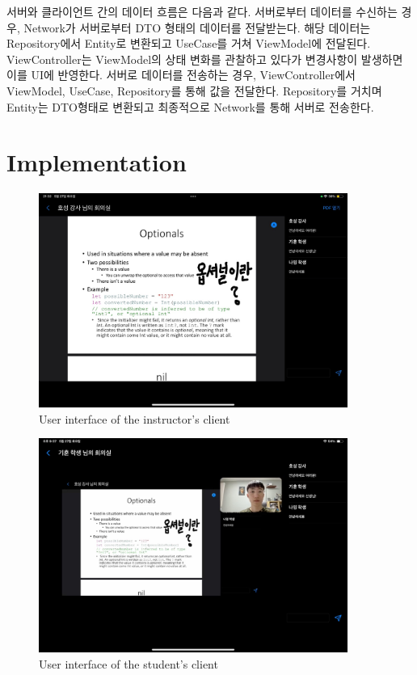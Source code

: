 \documentclass[pdflatex,sn-mathphys-num]{sn-jnl}%
\theoremstyle{thmstyleone}%
\theoremstyle{thmstyletwo}%
\theoremstyle{thmstylethree}%
\begin{document}
서버와 클라이언트 간의 데이터 흐름은 다음과 같다.
서버로부터 데이터를 수신하는 경우, Network가 서버로부터 DTO 형태의 데이터를 전달받는다. 해당 데이터는 Repository에서 Entity로 변환되고 UseCase를 거쳐 ViewModel에 전달된다. ViewController는 ViewModel의 상태 변화를 관찰하고 있다가 변경사항이 발생하면 이를 UI에 반영한다.
서버로 데이터를 전송하는 경우, ViewController에서 ViewModel, UseCase, Repository를 통해 값을 전달한다. Repository를 거치며 Entity는 DTO형태로 변환되고 최종적으로 Network를 통해 서버로 전송한다.

\section{Implementation}\label{sec3}

\begin{figure}[p]
\centering
\includegraphics[width=0.9\textwidth]{intructor.jpeg}
\caption{User interface of the instructor's client}\label{fig3}
\end{figure}

\begin{figure}[p]
\centering
\includegraphics[width=0.9\textwidth]{student.jpeg}
\caption{User interface of the student's client}\label{fig4}
\end{figure}
\end{document}
